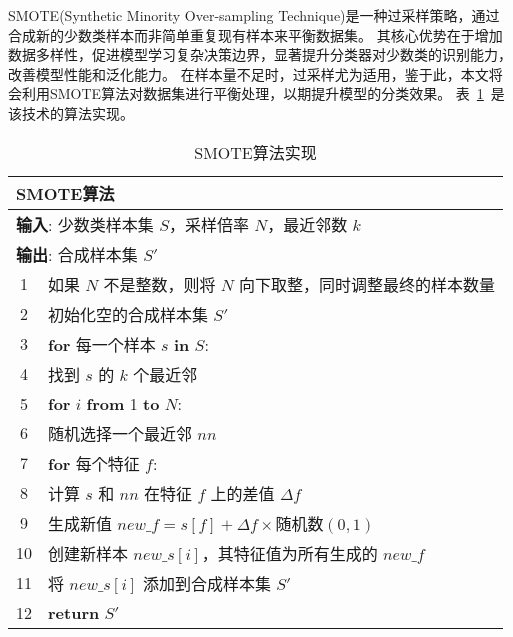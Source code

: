 SMOTE(Synthetic Minority Over-sampling Technique)是一种过采样策略，通过合成新的少数类样本而非简单重复现有样本来平衡数据集。
其核心优势在于增加数据多样性，促进模型学习复杂决策边界，显著提升分类器对少数类的识别能力，改善模型性能和泛化能力。
在样本量不足时，过采样尤为适用，鉴于此，本文将会利用SMOTE算法对数据集进行平衡处理，以期提升模型的分类效果。
表~\ref{tab:smote}~是该技术的算法实现。
\begin{table}[htbp]
	\caption{SMOTE算法实现}
	\label{tab:smote}
	\centering
	\begin{tabularx}{1.0\textwidth}{cl}
		\toprule
		\multicolumn{2}{l}{\textbf{SMOTE算法}}                                              \\
		\midrule
		\multicolumn{2}{l}{\textbf{输入}: 少数类样本集 $S$，采样倍率 $N$，最近邻数 $k$}     \\
		\multicolumn{2}{l}{\textbf{输出}: 合成样本集 $S'$}                                  \\
		1  & 如果 $N$ 不是整数，则将 $N$ 向下取整，同时调整最终的样本数量                   \\
		2  & 初始化空的合成样本集 $S'$                                                      \\
		3  & \textbf{for} 每一个样本 $s$ \textbf{in} $S$:                                   \\
		4  & \quad 找到 $s$ 的 $k$ 个最近邻                                                 \\
		5  & \quad \textbf{for} $i$ \textbf{from} 1 \textbf{to} $N$:                        \\
		6  & \quad\quad 随机选择一个最近邻 $nn$                                             \\
		7  & \quad\quad \textbf{for} 每个特征 $f$:                                          \\
		8  & \quad\quad\quad 计算 $s$ 和 $nn$ 在特征 $f$ 上的差值 $\Delta f$                \\
		9  & \quad\quad\quad 生成新值 $new\_f = s[f] + \Delta f \times \text{随机数}(0, 1)$ \\
		10 & \quad\quad 创建新样本 $new\_s[i]$，其特征值为所有生成的 $new\_f$               \\
		11 & \quad\quad 将 $new\_s[i]$ 添加到合成样本集 $S'$                                \\
		12 & \textbf{return} $S'$                                                           \\
		\bottomrule
	\end{tabularx}
\end{table}
